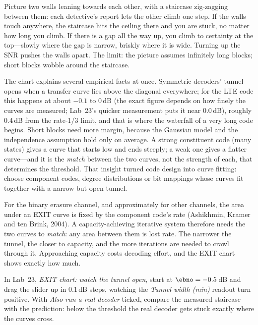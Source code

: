 \begin{analogy}
Picture two walls leaning towards each other, with a staircase zig-zagging between them: each
detective's report lets the other climb one step. If the walls touch anywhere, the staircase
hits the ceiling there and you are stuck, no matter how long you climb. If there is a gap all the
way up, you climb to certainty at the top---slowly where the gap is narrow, briskly where it is
wide. Turning up the SNR pushes the walls apart. The limit: the picture assumes infinitely long
blocks; short blocks wobble around the staircase.
\end{analogy}

The chart explains several empirical facts at once. Symmetric decoders' tunnel opens when a
transfer curve lies above the diagonal everywhere; for the LTE code this happens at about
$-0.1$ to 0\,dB (the exact figure depends on how finely the curves are measured; Lab~23's quicker
measurement puts it near 0.0\,dB), roughly 0.4\,dB from the rate-1/3 limit, and that is where the waterfall of a very long
code begins. Short blocks need more margin, because the Gaussian model and the independence
assumption hold only on average. A strong constituent code (many states) gives a curve that starts
low and ends steeply; a weak one gives a flatter curve---and it is the \emph{match} between the two
curves, not the strength of each, that determines the threshold. That insight turned code design
into curve fitting: choose component codes, degree distributions or bit mappings whose curves fit
together with a narrow but open tunnel.

\begin{keyidea}
For the binary erasure channel, and approximately for other channels, the area under an EXIT curve
is fixed by the component code's rate (Ashikhmin, Kramer and ten Brink, 2004). A capacity-achieving
iterative system therefore needs the two curves to \emph{match}: any area between them is lost rate.
The narrower the tunnel, the closer to capacity, and the more iterations are needed to crawl
through it. Approaching capacity costs decoding effort, and the EXIT chart shows exactly how much.
\end{keyidea}

\begin{tryit}
In Lab~23, \emph{EXIT chart: watch the tunnel open}, start at $\ebno=-0.5$\,dB and drag the
slider up in 0.1\,dB steps, watching the \emph{Tunnel width (min)} readout turn positive. With
\emph{Also run a real decoder} ticked, compare the measured staircase with the prediction: below
the threshold the real decoder gets stuck exactly where the curves cross.
\end{tryit}

